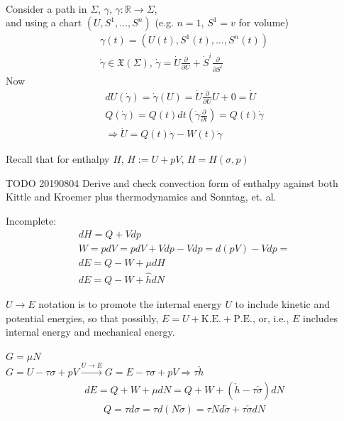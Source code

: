 \documentclass[10pt]{amsart}
\begin{document}
\begin{multicols*}{2}
\quad \\ 
Consider a path in $\Sigma$, $\gamma$, $\gamma : \mathbb{R} \to \Sigma$, \\
and using a chart $(U, S^1, \dots , S^n)$ (e.g. $n=1$, $S^1 = v$ for volume)
\[
\begin{gathered}
\gamma(t) = (U(t), S^1(t), \dots, S^n(t)) \\
\dot{\gamma} \in \mathfrak{X}(\Sigma), \, \dot{\gamma} = \dot{U} \frac{ \partial }{ \partial U} + \dot{S}^i \frac{ \partial }{ \partial S^i} 
\end{gathered}
\]
Now 
\[
\begin{gathered}
dU(\dot{\gamma}) = \dot{\gamma}(U) = \dot{U} \frac{ \partial }{ \partial U} U + 0 = \dot{U} \\
	Q(\dot{\gamma}) = Q(t) dt\left( \dot{\gamma} \frac{ \partial }{ \partial t} \right) = Q(t) \dot{\gamma} \\ 
	\Longrightarrow \dot{U} = Q(t) \dot{\gamma} - W(t) \dot{\gamma}
\end{gathered}
\]

Recall that for enthalpy $H$, $H := U + pV$, $H=H(\sigma, p)$

TODO 20190804 Derive and check convection form of enthalpy against both Kittle and Kroemer plus thermodynamics and Sonntag, et. al. 

Incomplete:
\[
\begin{gathered} 
dH = Q + Vdp \\
W = pdV = pdV + Vdp - Vdp = d(pV) - Vdp = \\
dE = Q-W + \mu dH \\
dE = Q- W + \widehat{h} dN
\end{gathered} 
\]

$U \to E$ notation is to promote the internal energy $U$ to include kinetic and potential energies, so that possibly, $E = U + \text{K.E.} + \text{P.E.}$, or, i.e., $E$ includes internal energy and mechanical energy.

$G = \mu N$ \\
$G = U - \tau \sigma + pV \xrightarrow{U \to E} G = E-\tau \sigma + pV \Longrightarrow \tau \check{h}$
\[
\begin{gathered}
dE = Q + W + \mu dN = Q + W + (\check{h} - \tau \check{\sigma})dN
\end{gathered}
\]
\[
\begin{gathered}
Q = \tau d\sigma = \tau d(N \check{\sigma}) = \tau N d\check{\sigma} + \tau \check{\sigma} dN
\end{gathered}
\]


\end{multicols*}
\end{document}
